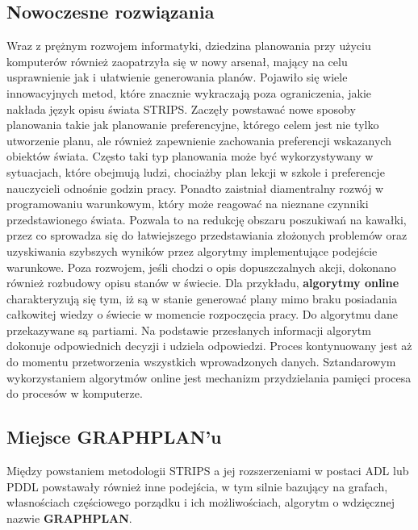     \subsection{Nowoczesne rozwiązania}
    Wraz z prężnym rozwojem informatyki, dziedzina planowania przy użyciu komputerów również zaopatrzyła się 
    w nowy arsenał, mający na celu usprawnienie jak i ułatwienie generowania planów.
    Pojawiło się wiele innowacyjnych metod, które znacznie wykraczają poza ograniczenia, jakie 
    nakłada język opisu świata STRIPS. Zaczęły powstawać nowe sposoby planowania takie jak planowanie preferencyjne, którego celem jest nie tylko
    utworzenie planu, ale również zapewnienie zachowania preferencji wskazanych obiektów świata. Często taki typ planowania 
    może być wykorzystywany w sytuacjach, które obejmują ludzi, chociażby plan lekcji w szkole i preferencje nauczycieli odnośnie godzin pracy.
    Ponadto zaistniał diamentralny rozwój w programowaniu warunkowym, który może reagować na nieznane 
    czynniki przedstawionego świata. Pozwala to na redukcję obszaru poszukiwań na kawałki, przez co sprowadza 
    się do łatwiejszego przedstawiania złożonych problemów oraz uzyskiwania szybszych wyników przez algorytmy implementujące podejście 
    warunkowe. Poza rozwojem, jeśli chodzi o opis dopuszczalnych akcji, dokonano również rozbudowy opisu stanów w świecie.
    Dla przykładu, \textbf{algorytmy online} charakteryzują się tym, iż są w stanie generować plany mimo braku posiadania całkowitej 
    wiedzy o świecie w momencie rozpoczęcia pracy. Do algorytmu dane przekazywane są partiami. Na podstawie przesłanych informacji algorytm dokonuje 
    odpowiednich decyzji i udziela odpowiedzi. Proces kontynuowany jest aż do momentu przetworzenia wszystkich wprowadzonych danych. Sztandarowym 
    wykorzystaniem algorytmów online jest mechanizm przydzielania pamięci procesa do procesów w komputerze.

    
    \subsection{Miejsce GRAPHPLAN'u}
    Między powstaniem metodologii STRIPS a jej rozszerzeniami w postaci ADL lub PDDL powstawały również inne podejścia, w tym silnie 
    bazujący na grafach, własnościach częściowego porządku i ich możliwościach, algorytm o wdzięcznej nazwie \textbf{GRAPHPLAN}.






